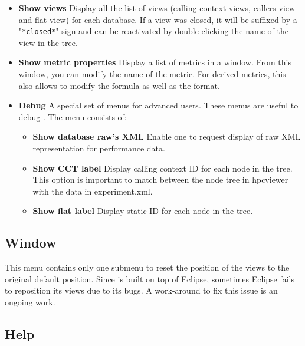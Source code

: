 \documentclass[english]{article}
\begin{document}
\begin{itemize}
 \item \textbf{Show views}
 Display all the list of views (calling context views, callers view and flat view) for each database. If a view was closed, it will be suffixed by a "\texttt{*closed*}" sign and can be reactivated by double-clicking the name of the view in the tree.

 \item \textbf{Show metric properties}
 Display a list of metrics in a window. From this window, you can modify the name of the metric. For derived metrics, this also allows to modify the formula as well as the format.

 \item \textbf{Debug}
 A special set of menus for advanced users. These menus are useful to debug . The menu consists of:

   \begin{itemize}
     \item \textbf{Show database raw's XML}
 	Enable one to request display of raw XML representation for performance data.

     \item \textbf{Show CCT label}
 	Display calling context ID for each node in the tree. This option is important to match between the node tree in hpcviewer with the data in experiment.xml.

     \item \textbf{Show flat label}
 	Display static ID for each node in the tree.
  \end{itemize}

\end{itemize}

\subsection{Window}
This menu contains only one submenu to reset the position of the views to the original default position.
Since  is built on top of Eclipse, sometimes Eclipse fails to reposition its views due to its bugs.
A work-around to fix this issue is an ongoing work.


\subsection{Help}
\end{document}
